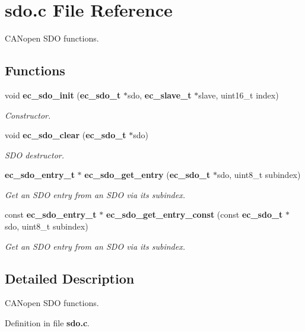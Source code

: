 \section{sdo.\-c File Reference}
\label{sdo_8c}


C\-A\-Nopen S\-D\-O functions.  


\subsection*{Functions}
\begin{DoxyCompactItemize}
\item 
void {\bf ec\-\_\-sdo\-\_\-init} ({\bf ec\-\_\-sdo\-\_\-t} $\ast$sdo, {\bf ec\-\_\-slave\-\_\-t} $\ast$slave, uint16\-\_\-t index)
\begin{DoxyCompactList}\small\item\em Constructor. \end{DoxyCompactList}\item 
void {\bf ec\-\_\-sdo\-\_\-clear} ({\bf ec\-\_\-sdo\-\_\-t} $\ast$sdo)
\begin{DoxyCompactList}\small\item\em S\-D\-O destructor. \end{DoxyCompactList}\item 
{\bf ec\-\_\-sdo\-\_\-entry\-\_\-t} $\ast$ {\bf ec\-\_\-sdo\-\_\-get\-\_\-entry} ({\bf ec\-\_\-sdo\-\_\-t} $\ast$sdo, uint8\-\_\-t subindex)
\begin{DoxyCompactList}\small\item\em Get an S\-D\-O entry from an S\-D\-O via its subindex. \end{DoxyCompactList}\item 
const {\bf ec\-\_\-sdo\-\_\-entry\-\_\-t} $\ast$ {\bf ec\-\_\-sdo\-\_\-get\-\_\-entry\-\_\-const} (const {\bf ec\-\_\-sdo\-\_\-t} $\ast$sdo, uint8\-\_\-t subindex)
\begin{DoxyCompactList}\small\item\em Get an S\-D\-O entry from an S\-D\-O via its subindex. \end{DoxyCompactList}\end{DoxyCompactItemize}


\subsection{Detailed Description}
C\-A\-Nopen S\-D\-O functions. 

Definition in file {\bf sdo.\-c}.



